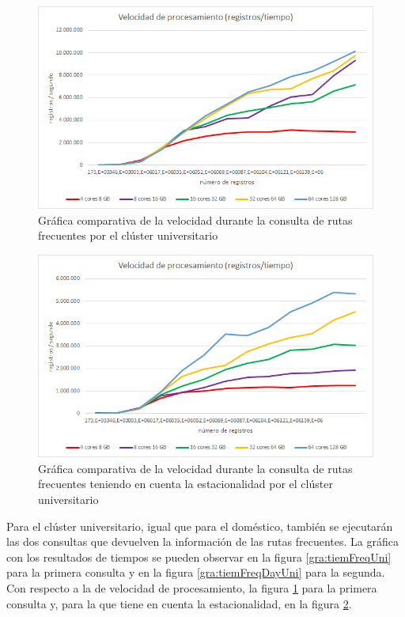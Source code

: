 \begin{figure}[htp!]
	\centering
	\caption{Gráfica comparativa de la velocidad durante la consulta de rutas frecuentes por el clúster universitario}
	\label{gra:velFreqUni}
	\vspace{5pt}
	\includegraphics[scale=0.8]{graficas/vfuni}
\end{figure}
\begin{figure}[htp!]
	\centering
	\caption{Gráfica comparativa de la velocidad durante la consulta de rutas frecuentes teniendo en cuenta la estacionalidad por el clúster universitario}
	\label{gra:velFreqDayUni}
	\vspace{5pt}
	\includegraphics[scale=0.9]{graficas/vfduni}
\end{figure}

Para el clúster universitario, igual que para el doméstico, también se ejecutarán las dos consultas que devuelven la información de las rutas frecuentes. La gráfica con los resultados de tiempos se pueden observar en la figura \ref{gra:tiemFreqUni} para la primera consulta y en la figura \ref{gra:tiemFreqDayUni} para la segunda. Con respecto a la de velocidad de procesamiento, la figura \ref{gra:velFreqUni} para la primera consulta y, para la que tiene en cuenta la estacionalidad, en la figura \ref{gra:velFreqDayUni}.

